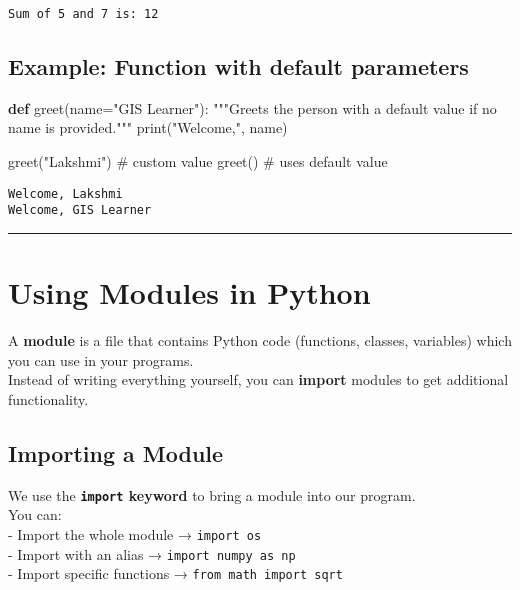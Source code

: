 \documentclass[
  11pt,
  letterpaper,
]{book}
\newenvironment{Shaded}{\begin{snugshade}}{\end{snugshade}}
\newcommand{\BuiltInTok}[1]{\textcolor[rgb]{0.00,0.23,0.31}{#1}}
\newcommand{\CommentTok}[1]{\textcolor[rgb]{0.37,0.37,0.37}{#1}}
\newcommand{\KeywordTok}[1]{\textcolor[rgb]{0.00,0.23,0.31}{\textbf{#1}}}
\newcommand{\NormalTok}[1]{\textcolor[rgb]{0.00,0.23,0.31}{#1}}
\newcommand{\OperatorTok}[1]{\textcolor[rgb]{0.37,0.37,0.37}{#1}}
\newcommand{\StringTok}[1]{\textcolor[rgb]{0.13,0.47,0.30}{#1}}
\begin{document}
\begin{verbatim}
Sum of 5 and 7 is: 12
\end{verbatim}

\subsection{Example: Function with default
parameters}\label{example-function-with-default-parameters}

\begin{Shaded}
\begin{Highlighting}[]
\KeywordTok{def}\NormalTok{ greet(name}\OperatorTok{=}\StringTok{"GIS Learner"}\NormalTok{):}
    \CommentTok{"""Greets the person with a default value if no name is provided."""}
    \BuiltInTok{print}\NormalTok{(}\StringTok{"Welcome,"}\NormalTok{, name)}

\NormalTok{greet(}\StringTok{"Lakshmi"}\NormalTok{)    }\CommentTok{\# custom value}
\NormalTok{greet()             }\CommentTok{\# uses default value}
\end{Highlighting}
\end{Shaded}

\begin{verbatim}
Welcome, Lakshmi
Welcome, GIS Learner
\end{verbatim}

\begin{center}\rule{0.5\linewidth}{0.5pt}\end{center}

\section{Using Modules in Python}\label{using-modules-in-python}

A \textbf{module} is a file that contains Python code (functions,
classes, variables) which you can use in your programs.\\
Instead of writing everything yourself, you can \textbf{import} modules
to get additional functionality.

\subsection{Importing a Module}\label{importing-a-module}

We use the \textbf{\texttt{import} keyword} to bring a module into our
program.\\
You can:\\
- Import the whole module → \texttt{import\ os}\\
- Import with an alias → \texttt{import\ numpy\ as\ np}\\
- Import specific functions → \texttt{from\ math\ import\ sqrt}
\end{document}
